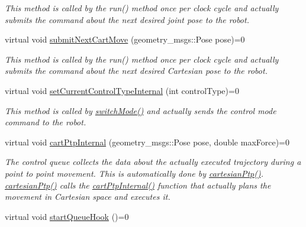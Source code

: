 \begin{DoxyCompactItemize}
\begin{DoxyCompactList}\small\item\em This method is called by the run() method once per clock cycle and actually submits the command about the next desired joint pose to the robot. \end{DoxyCompactList}\item 
\hypertarget{classkukadu_1_1ControlQueue_a910db788a6da11006d358a84197bff23}{virtual void \hyperlink{classkukadu_1_1ControlQueue_a910db788a6da11006d358a84197bff23}{submit\-Next\-Cart\-Move} (geometry\-\_\-msgs\-::\-Pose pose)=0}\label{classkukadu_1_1ControlQueue_a910db788a6da11006d358a84197bff23}

\begin{DoxyCompactList}\small\item\em This method is called by the run() method once per clock cycle and actually submits the command about the next desired Cartesian pose to the robot. \end{DoxyCompactList}\item 
\hypertarget{classkukadu_1_1ControlQueue_a76e7bf30b8e694c0db9bec92e06529a0}{virtual void \hyperlink{classkukadu_1_1ControlQueue_a76e7bf30b8e694c0db9bec92e06529a0}{set\-Current\-Control\-Type\-Internal} (int control\-Type)=0}\label{classkukadu_1_1ControlQueue_a76e7bf30b8e694c0db9bec92e06529a0}

\begin{DoxyCompactList}\small\item\em This method is called by \hyperlink{classkukadu_1_1ControlQueue_a5defe63d9f1b9829676f9a31a4683911}{switch\-Mode()} and actually sends the control mode command to the robot. \end{DoxyCompactList}\item 
\hypertarget{classkukadu_1_1ControlQueue_a13059c37abe4846a356e0cfcf10958b9}{virtual void \hyperlink{classkukadu_1_1ControlQueue_a13059c37abe4846a356e0cfcf10958b9}{cart\-Ptp\-Internal} (geometry\-\_\-msgs\-::\-Pose pose, double max\-Force)=0}\label{classkukadu_1_1ControlQueue_a13059c37abe4846a356e0cfcf10958b9}

\begin{DoxyCompactList}\small\item\em The control queue collects the data about the actually executed trajectory during a point to point movement. This is automatically done by \hyperlink{classkukadu_1_1ControlQueue_a1bfa23a8ce6319f6ef0ed9208e896054}{cartesian\-Ptp()}. \hyperlink{classkukadu_1_1ControlQueue_a1bfa23a8ce6319f6ef0ed9208e896054}{cartesian\-Ptp()} calls the \hyperlink{classkukadu_1_1ControlQueue_a13059c37abe4846a356e0cfcf10958b9}{cart\-Ptp\-Internal()} function that actually plans the movement in Cartesian space and executes it. \end{DoxyCompactList}\item 
\hypertarget{classkukadu_1_1ControlQueue_a87d7c2d918d0ca720eeae609959d4d78}{virtual void \hyperlink{classkukadu_1_1ControlQueue_a87d7c2d918d0ca720eeae609959d4d78}{start\-Queue\-Hook} ()=0}\label{classkukadu_1_1ControlQueue_a87d7c2d918d0ca720eeae609959d4d78}


\end{DoxyCompactItemize}
